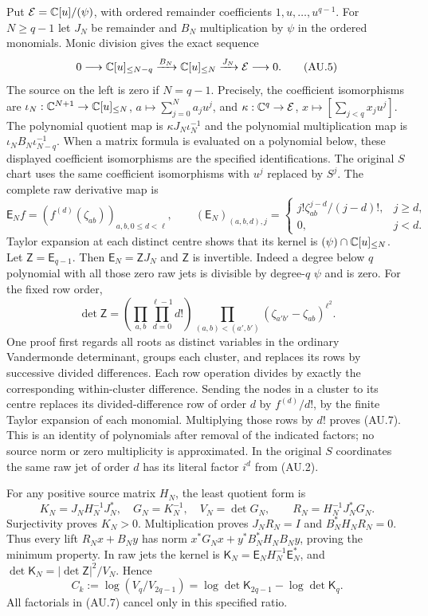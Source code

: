 Put $\mathcal E=\mathbb C[u]/(\psi)$, with ordered remainder coefficients
$1,u,\ldots,u^{q-1}$. For $N\ge q-1$ let $J_N$ be remainder and
$B_N$ multiplication by $\psi$ in the ordered monomials. Monic division
gives the exact sequence
\[
 0\longrightarrow\mathbb C[u]_{\le N-q}
 \xrightarrow{B_N}\mathbb C[u]_{\le N}
 \xrightarrow{J_N}\mathcal E\longrightarrow0.              \tag{AU.5}
\]
The source on the left is zero if $N=q-1$.
Precisely, the coefficient isomorphisms are
$\iota_N:\mathbb C^{N+1}\to\mathbb C[u]_{\le N}$,
$a\mapsto\sum_{j=0}^Na_ju^j$, and
$\kappa:\mathbb C^q\to\mathcal E$, $x\mapsto[\sum_{j<q}x_ju^j]$.
The polynomial quotient map is $\kappa J_N\iota_N^{-1}$ and the
polynomial multiplication map is
$\iota_N B_N\iota_{N-q}^{-1}$. When a matrix formula is evaluated
on a polynomial below, these displayed coefficient isomorphisms are
the specified identifications. The original $S$ chart uses the same
coefficient isomorphisms with $u^j$ replaced by $S^j$.
The complete raw derivative map is
\[
 \mathsf E_N f=(f^{(d)}(\zeta_{ab}))_{a,b,0\le d<\ell},
 \qquad
 (\mathsf E_N)_{(a,b,d),j}=
 \begin{cases}j!\zeta_{ab}^{j-d}/(j-d)!,&j\ge d,\\0,&j<d.
 \end{cases}                                                \tag{AU.6}
\]
Taylor expansion at each distinct centre shows that its kernel is
$(\psi)\cap\mathbb C[u]_{\le N}$. Let $\mathsf Z=\mathsf E_{q-1}$.
Then $\mathsf E_N=\mathsf ZJ_N$ and $\mathsf Z$ is invertible.
Indeed a degree below $q$ polynomial with all those zero raw jets is
divisible by degree-$q$ $\psi$ and is zero. For the fixed row order,
\[
 \det\mathsf Z=
 \left(\prod_{a,b}\prod_{d=0}^{\ell-1}d!\right)
 \prod_{(a,b)<(a',b')}(\zeta_{a'b'}-\zeta_{ab})^{\ell^2}.
 \tag{AU.7}
\]
One proof first regards all roots as distinct variables in the ordinary
Vandermonde determinant, groups each cluster, and replaces its rows by
successive divided differences. Each row operation divides by exactly
the corresponding within-cluster difference. Sending the nodes in a
cluster to its centre replaces its divided-difference row of order $d$
by $f^{(d)}/d!$, by the finite Taylor expansion of each monomial.
Multiplying those rows by $d!$ proves (AU.7). This is an identity of
polynomials after removal of the indicated factors; no source norm or
zero multiplicity is approximated. In the original $S$ coordinates the
same raw jet of order $d$ has its literal factor $i^d$ from (AU.2).

For any positive source matrix $H_N$, the least quotient form is
\[
 K_N=J_NH_N^{-1}J_N^*,\quad G_N=K_N^{-1},\quad V_N=\det G_N,
 \qquad R_N=H_N^{-1}J_N^*G_N.                               \tag{AU.8}
\]
Surjectivity proves $K_N>0$. Multiplication proves $J_NR_N=I$ and
$B_N^*H_NR_N=0$. Thus every lift $R_Nx+B_Ny$ has norm
$x^*G_Nx+y^*B_N^*H_NB_Ny$, proving the minimum property.
In raw jets the kernel is $\mathsf K_N=\mathsf E_NH_N^{-1}\mathsf E_N^*$,
and $\det\mathsf K_N=|\det\mathsf Z|^2/V_N$. Hence
\[
 C_k:=\log(V_q/V_{2q-1})
      =\log\det\mathsf K_{2q-1}-\log\det\mathsf K_q.
 \tag{AU.9}
\]
All factorials in (AU.7) cancel only in this specified ratio.

